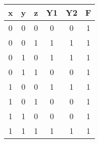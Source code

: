 \begin{tabular}{ |c |c |c |c |c |c|}    
\hline
\newline         
\textbf{x} & \textbf{y} & \textbf{z} & \textbf{Y1} & \textbf{Y2} & \textbf{F}  \\
\hline                                         
 0 & 0 & 0 &0 &0 &1 \\
 \hline
 0 & 0 & 1 &1 &1 &1 \\
 \hline
 0 & 1 & 0 &1 &1 &1 \\
 \hline
 0 & 1 & 1 &0 &0 &1 \\
 \hline
 1 & 0 & 0 &1 &1 &1 \\
 \hline
 1 & 0 & 1 &0 &0 &1 \\
 \hline
 1 & 1 & 0 &0 &0 &1 \\
 \hline
 1 & 1 & 1 &1 &1 &1 \\
 \hline
\end{tabular}
